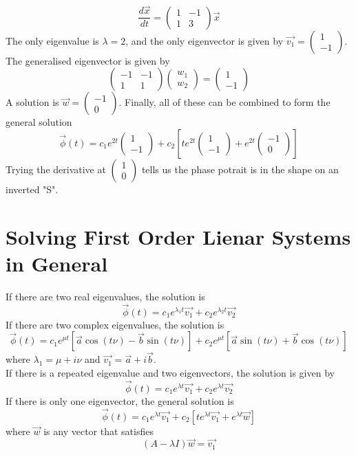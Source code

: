 \documentclass[12pt]{article}
\begin{document}
\begin{ex}
	$$\frac{d\vec{x}}{dt} = \begin{pmatrix} 1 & -1 \\ 1 & 3\end{pmatrix}\vec{x}$$
	The only eigenvalue is $\lambda=2$, and the only eigenvector is given by $\vec{v_1} = \begin{pmatrix} 1 \\ -1\end{pmatrix}$. The generalised eigenvector is given by
	$$\begin{pmatrix} -1 & -1 \\ 1 & 1\end{pmatrix}\begin{pmatrix}w_1 \\ w_2\end{pmatrix} = \begin{pmatrix} 1 \\ -1\end{pmatrix}$$
	A solution is $\vec{w} = \begin{pmatrix} -1 \\ 0\end{pmatrix}$. Finally, all of these can be combined to form the general solution
	$$\vec{\phi}(t) = c_1e^{2t}\begin{pmatrix} 1 \\ -1\end{pmatrix} + c_2\left[te^{2t}\begin{pmatrix} 1 \\ -1\end{pmatrix} + e^{2t}\begin{pmatrix}-1 \\ 0\end{pmatrix}\right]$$
	Trying the derivative at $\begin{pmatrix} 1 \\ 0\end{pmatrix}$ tells us the phase potrait is in the shape on an inverted "S".
\end{ex}

\section{Solving First Order Lienar Systems in General}
If there are two real eigenvalues, the solution is
$$\vec{\phi}(t) = c_1e^{\lambda_1 t}\vec{v_1} + c_2e^{\lambda_2 t}\vec{v_2}$$
If there are two complex eigenvalues, the solution is
$$\vec{\phi}(t) = c_1e^{\mu t}\left[\vec{a}\cos(t\nu)-\vec{b}\sin(t\nu)\right] + c_2e^{\mu t}\left[\vec{a}\sin(t\nu)+\vec{b}\cos(t\nu)\right]$$
where $\lambda_1 = \mu+i\nu$ and $\vec{v_1} = \vec{a}+i\vec{b}$. \\
If there is a repeated eigenvalue and two eigenvectors, the solution is given by
$$\vec{\phi}(t) = c_1e^{\lambda t}\vec{v_1} + c_2e^{\lambda t}\vec{v_2}$$
If there is only one eigenvector, the general solution is 
$$\vec{\phi}(t) = c_1e^{\lambda t}\vec{v_1} + c_2\left[te^{\lambda t}\vec{v_1} + e^{\lambda t}\vec{w}\right]$$
where $\vec{w}$ is any vector that satisfies
$$(A-\lambda I)\vec{w} = \vec{v_1}$$
\end{document}
